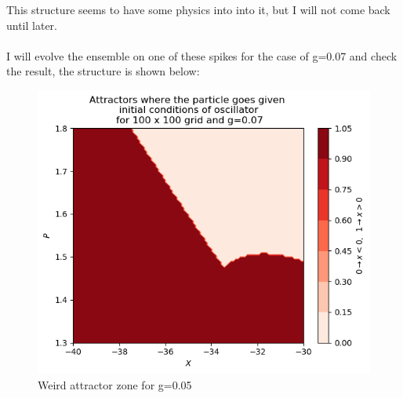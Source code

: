 \documentclass[idxtotoc,hyperref,openany]{labbook} %
\begin{document}
This structure seems to have some physics into into it, but I will not come back until later.
\\
\\
I will evolve the ensemble on one of these spikes for the case of g=0.07 and check the result, the structure is shown below:
\begin{figure}[H] %
\begin{center}
\includegraphics[width=1\linewidth]{zonararag0-07CalvoSanz.png}
\end{center}
\caption{Weird attractor zone for g=0.05}
\label{WeirdAttractorg0-05}
\end{figure}

\end{document}
